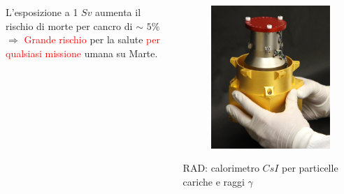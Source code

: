 \documentclass[9pt]{beamer}
\begin{document}
\begin{frame} [fragile]
\begin{columns}
\begin{column}{0.50\textwidth}
L'esposizione a 1 $Sv$ aumenta il rischio di morte per cancro di $\sim$ $5$$\%$ $\Longrightarrow$ \textcolor{red}{Grande rischio} per la salute \newline
\textcolor{red}{per qualsiasi missione} umana su Marte. 
	 \end{column}
    \begin{column}{0.50\textwidth}
 \newline
\begin{figure}
	  \centering
			\includegraphics[scale=.10]{figures/fig6_2.jpg}
		\end{figure}
		\begin{block}{}
		RAD: calorimetro $CsI$ per particelle cariche e raggi $\gamma$
		\end{block}
    \end{column}
\end{columns}
\end{frame}



\end{document}
